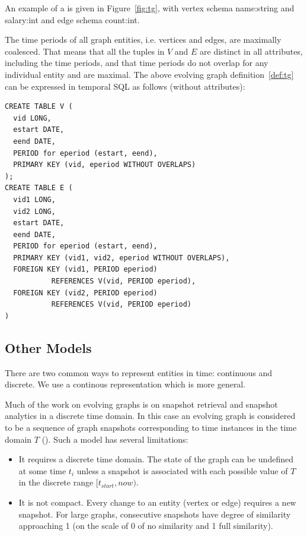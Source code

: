An example of a \tg is given in Figure~\ref{fig:tg}, with vertex
schema name:string and salary:int and edge schema count:int.

The time periods of all graph entities, i.e. vertices and edges, are
maximally coalesced.  That means that all the tuples in $V$ and $E$
are distinct in all attributes, including the time periods, and that
time periods do not overlap for any individual entity and are maximal.
The above evolving graph definition~\ref{def:tg} can be expressed in
temporal SQL as follows (without attributes):

\begin{small}
\begin{verbatim}
CREATE TABLE V (
  vid LONG,
  estart DATE,
  eend DATE,
  PERIOD for eperiod (estart, eend),
  PRIMARY KEY (vid, eperiod WITHOUT OVERLAPS)
);
CREATE TABLE E (
  vid1 LONG,
  vid2 LONG,
  estart DATE,
  eend DATE,
  PERIOD for eperiod (estart, eend),
  PRIMARY KEY (vid1, vid2, eperiod WITHOUT OVERLAPS),
  FOREIGN KEY (vid1, PERIOD eperiod) 
           REFERENCES V(vid, PERIOD eperiod),
  FOREIGN KEY (vid2, PERIOD eperiod) 
           REFERENCES V(vid, PERIOD eperiod)
)
\end{verbatim}
\end{small}


\subsection{Other Models}
\label{sec:model:others}

There are two common ways to represent entities in time: continuous
and discrete.  We use a continous representation which is more general.

Much of the work on evolving graphs is on snapshot retrieval and
snapshot analytics in a discrete time domain.  In this case an
evolving graph is considered to be a sequence of graph snapshots
corresponding to time instances in the time domain $T$
(\cite{Khurana2013,DBLP:journals/tos/MiaoHLWYZPCC15,Ren2011}).  Such a
model has several limitations:

\begin{itemize}[noitemsep,topsep=0pt]
\item It requires a discrete time domain.  The state of the graph can
  be undefined at some time $t_i$ unless a snapshot is associated with
  each possible value of $T$ in the discrete range $[t_{start}, now)$.
\item It is not compact.  Every change to an entity (vertex or edge)
  requires a new snapshot.  For large graphs, consecutive snapshots
  have degree of similarity approaching 1 (on the scale of 0 of no
  similarity and 1 full similarity).
\end{itemize}

